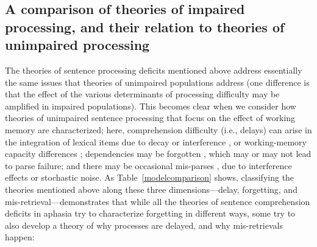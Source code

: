 \documentclass{cambridge7A}\usepackage[]{graphicx}\usepackage[]{color}
\begin{document}
\subsection{A comparison of theories of impaired processing, and their relation to theories of unimpaired processing}

The theories of sentence processing deficits mentioned above address essentially the same issues that theories of unimpaired populations address (one difference is that the effect of the various determinants of processing difficulty may be amplified in impaired populations). This becomes clear when we consider how  theories of unimpaired sentence processing that focus on the effect of working memory are characterized; here, comprehension difficulty (i.e., delays) can arise in the integration of lexical items due to decay or interference \citep{vandykelewis03}, or working-memory capacity differences \cite{JustCarpenter1992}; dependencies may be forgotten \cite{taboretal04,VasishthSuckowLewis2010,FrankTrompenaarsVasishth2015}, which may or may not lead to parse failure; and there may be occasional mis-parses \cite{WagersLauPhillips2009,BadeckerStraub2002,VasishthBruessowLewis2008,CunningsFelser2013,PatilVasishthLewis2016}, due to interference effects or stochastic noise.
As Table~\ref{modelcomparison} shows, classifying the theories mentioned above along these three dimensions---delay, forgetting, and mis-retrieval---demonstrates that while all the theories of sentence comprehension deficits in aphasia try to characterize forgetting in different ways, some try to also develop a theory of why processes are delayed, and why mis-retrievals happen:
\end{document}
